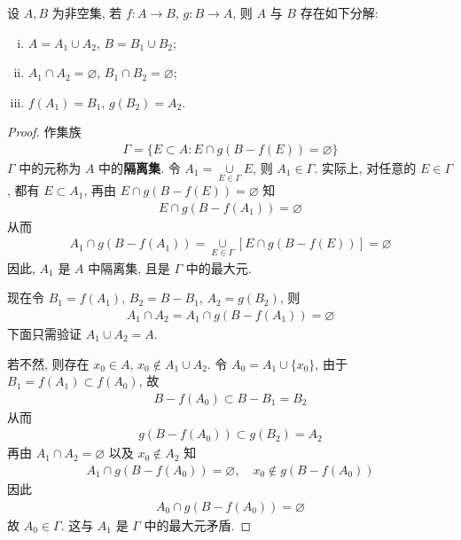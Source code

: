 \documentclass[../../main.tex]{subfiles}
\begin{document}
\begin{lemma}\label{lemma:映射定义域与陪域的无交分解}
设 $A, B$ 为非空集, 若 $f : A \to B$, $g : B \to A$, 则 $A$ 与 $B$ 存在如下分解:
\begin{enumerate}[(i)]
\item $A = A_1 \cup A_2$, $B = B_1 \cup B_2$;
\item $A_1 \cap A_2 = \varnothing$, $B_1 \cap B_2 = \varnothing$;
\item $f(A_1) = B_1$, $g(B_2) = A_2$.
\end{enumerate}
\end{lemma}
\begin{proof}
作集族
\begin{align*}
\Gamma = \{E \subset A : E \cap g(B - f(E)) = \varnothing\}
\end{align*}
$\Gamma$ 中的元称为 $A$ 中的\textbf{隔离集}. 令 $A_1 = \underset{E \in \Gamma}{\cup} E$, 则 $A_1 \in \Gamma$. 实际上, 对任意的 $E \in \Gamma$, 都有 $E \subset A_1$, 再由 $E \cap g(B - f(E)) = \varnothing$ 知
\begin{align*}
E \cap g(B - f(A_1)) = \varnothing
\end{align*}
从而
\begin{align*}
A_1 \cap g(B - f(A_1)) = \underset{E \in \Gamma}{\cup}[E \cap g(B - f(E))] = \varnothing
\end{align*}
因此, $A_1$ 是 $A$ 中隔离集, 且是 $\Gamma$ 中的最大元.

现在令 $B_1 = f(A_1)$, $B_2 = B - B_1$, $A_2 = g(B_2)$, 则
\begin{align*}
A_1 \cap A_2 = A_1 \cap g(B - f(A_1)) = \varnothing
\end{align*}
下面只需验证 $A_1 \cup A_2 = A$.

若不然, 则存在 $x_0 \in A$, $x_0 \notin A_1 \cup A_2$. 令 $A_0 = A_1 \cup \{x_0\}$, 由于 $B_1 = f(A_1) \subset f(A_0)$, 故
\begin{align*}
B - f(A_0) \subset B - B_1 = B_2
\end{align*}
从而
\begin{align*}
g(B - f(A_0)) \subset g(B_2) = A_2
\end{align*}
再由 $A_1 \cap A_2 = \varnothing$ 以及 $x_0 \notin A_2$ 知
\begin{align*}
A_1 \cap g(B - f(A_0)) = \varnothing, \quad x_0 \notin g(B - f(A_0))
\end{align*}
因此
\begin{align*}
A_0 \cap g(B - f(A_0)) = \varnothing
\end{align*}
故 $A_0 \in \Gamma$. 这与 $A_1$ 是 $\Gamma$ 中的最大元矛盾. 
\end{proof}
\end{document}
